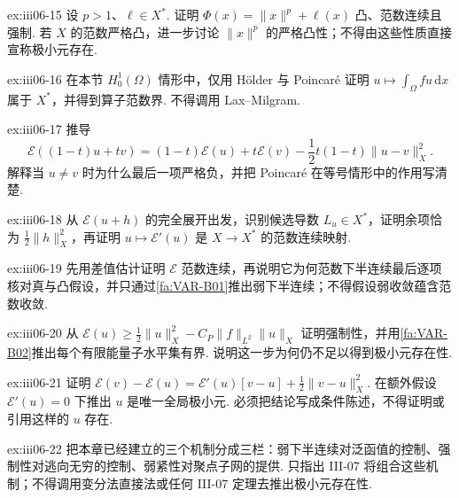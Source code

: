 \begin{FAExercise}[范数幂例]{ex:iii06-15}
设 \(\displaystyle p>1\)、\(\displaystyle\ell\in X^*\). 证明 \(\displaystyle\Phi(x)=\|x\|^p+\ell(x)\) 凸、范数连续且强制. 若 \(\displaystyle X\) 的范数严格凸，进一步讨论 \(\displaystyle\|x\|^p\) 的严格凸性；不得由这些性质直接宣称极小元存在.
\end{FAExercise}

\begin{FAExercise}[椭圆能量泛函的良定义性]{ex:iii06-16}
在本节 \(\displaystyle H_0^1(\Omega)\) 情形中，仅用 Hölder 与 Poincaré 证明 \(\displaystyle u\mapsto\int_\Omega fu\,\mathrm{d}x\) 属于 \(\displaystyle X^*\)，并得到算子范数界. 不得调用 Lax--Milgram.
\end{FAExercise}

\begin{FAExercise}[椭圆能量泛函的严格凸性]{ex:iii06-17}
推导
\[
\mathcal E((1-t)u+tv)
=
(1-t)\mathcal E(u)+t\mathcal E(v)-\frac{1}{2}t(1-t)\|u-v\|_X^2.
\]
解释当 \(\displaystyle u\neq v\) 时为什么最后一项严格负，并把 Poincaré 在等号情形中的作用写清楚.
\end{FAExercise}

\begin{FAExercise}{ex:iii06-18}
从 \(\displaystyle\mathcal E(u+h)\) 的完全展开出发，识别候选导数 \(\displaystyle L_u\in X^*\)，证明余项恰为 \(\displaystyle\frac{1}{2}\|h\|_X^2\)，再证明 \(\displaystyle u\mapsto\mathcal E'(u)\) 是 \(\displaystyle X\to X^*\) 的范数连续映射.
\end{FAExercise}

\begin{FAExercise}{ex:iii06-19}
先用差值估计证明 \(\displaystyle\mathcal E\) 范数连续，再说明它为何范数下半连续最后逐项核对真与凸假设，并只通过\autoref{fa:VAR-B01}推出弱下半连续；不得假设弱收敛蕴含范数收敛.
\end{FAExercise}

\begin{FAExercise}[椭圆能量泛函的强制性]{ex:iii06-20}
从
\(\displaystyle \mathcal E(u) \geqslant \frac{1}{2}\|u\|_X^2-C_P\|f\|_{L^2}\|u\|_X\)
证明强制性，并用\autoref{fa:VAR-B02}推出每个有限能量子水平集有界. 说明这一步为何仍不足以得到极小元存在性.
\end{FAExercise}

\begin{FAExercise}[临界点与唯一极小元的条件关系]{ex:iii06-21}
证明
\(\displaystyle \mathcal E(v)-\mathcal E(u) = \mathcal E'(u)[v-u] + \frac{1}{2}\|v-u\|_X^2.\)
在额外假设 \(\displaystyle\mathcal E'(u)=0\) 下推出 \(\displaystyle u\) 是唯一全局极小元. 必须把结论写成条件陈述，不得证明或引用这样的 \(\displaystyle u\) 存在.
\end{FAExercise}

\begin{FAExercise}[后续直接法准备]{ex:iii06-22}
把本章已经建立的三个机制分成三栏：弱下半连续对泛函值的控制、强制性对逃向无穷的控制、弱紧性对聚点子网的提供. 只指出 III-07 将组合这些机制；不得调用变分法直接法或任何 III-07 定理去推出极小元存在性.
\end{FAExercise}
